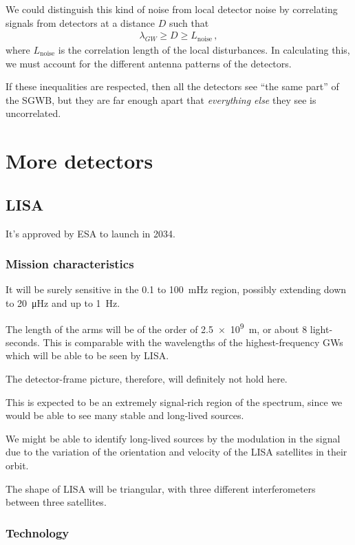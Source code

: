 \documentclass[main.tex]{subfiles}
\begin{document}
We could distinguish this kind of noise from local detector noise by correlating signals from detectors at a distance \(D\) such that 
%
\begin{align}
\lambda_{GW} \geq D \geq L _{\text{noise}}
\,,
\end{align}
%
where \(L _{\text{noise}}\) is the correlation length of the local disturbances. 
In calculating this, we must account for the different antenna patterns of the detectors.

If these inequalities are respected, then all the detectors see ``the same part'' of the SGWB, but they are far enough apart that \emph{everything else} they see is uncorrelated. 

\section{More detectors}

\subsection{LISA}

It's approved by ESA to launch in 2034. 

\subsubsection{Mission characteristics}

It will be surely sensitive in the \num{.1} to \SI{100}{mHz} region, possibly extending down to \SI{20}{\micro Hz} and up to \SI{1}{Hz}. 

The length of the arms will be of the order of \SI{2.5e9}{m}, or about 8 light-seconds. This is comparable with the wavelengths of the highest-frequency GWs which will be able to be seen by LISA. 

The detector-frame picture, therefore, will definitely not hold here. 

This is expected to be an extremely signal-rich region of the spectrum, since we would be able to see many stable and long-lived sources. 

We might be able to identify long-lived sources by the modulation in the signal due to the variation of the orientation and velocity of the LISA satellites in their orbit.

The shape of LISA will be triangular, with three different interferometers between three satellites. 

\subsubsection{Technology}
\end{document}
